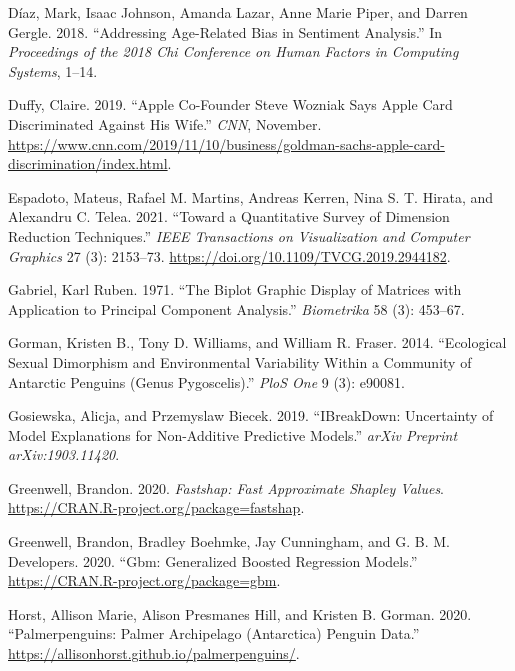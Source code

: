 \documentclass[11pt,twoside]{article}
\newlength{\cslhangindent}
\newlength{\cslentryspacingunit} %
\newenvironment{CSLReferences}[2] %
 {%
  \setlength{\parindent}{0pt}
  \ifodd #1
  \let\oldpar\par
  \def\par{\hangindent=\cslhangindent\oldpar}
  \fi
  \setlength{\parskip}{#2\cslentryspacingunit}
 }%
 {}
\begin{document}
\begin{CSLReferences}{1}{0}
\leavevmode{}%
Díaz, Mark, Isaac Johnson, Amanda Lazar, Anne Marie Piper, and Darren Gergle. 2018. {``Addressing Age-Related Bias in Sentiment Analysis.''} In \emph{Proceedings of the 2018 Chi Conference on Human Factors in Computing Systems}, 1--14.

\leavevmode{}%
Duffy, Claire. 2019. {``Apple Co-Founder {Steve} {Wozniak} Says {Apple} {Card} Discriminated Against His Wife.''} \emph{CNN}, November. \url{https://www.cnn.com/2019/11/10/business/goldman-sachs-apple-card-discrimination/index.html}.

\leavevmode{}%
Espadoto, Mateus, Rafael M. Martins, Andreas Kerren, Nina S. T. Hirata, and Alexandru C. Telea. 2021. {``Toward a {Quantitative} {Survey} of {Dimension} {Reduction} {Techniques}.''} \emph{IEEE Transactions on Visualization and Computer Graphics} 27 (3): 2153--73. \url{https://doi.org/10.1109/TVCG.2019.2944182}.

\leavevmode{}%
Gabriel, Karl Ruben. 1971. {``The Biplot Graphic Display of Matrices with Application to Principal Component Analysis.''} \emph{Biometrika} 58 (3): 453--67.

\leavevmode{}%
Gorman, Kristen B., Tony D. Williams, and William R. Fraser. 2014. {``Ecological Sexual Dimorphism and Environmental Variability Within a Community of {Antarctic} Penguins (Genus {Pygoscelis}).''} \emph{PloS One} 9 (3): e90081.

\leavevmode{}%
Gosiewska, Alicja, and Przemyslaw Biecek. 2019. {``{IBreakDown}: {Uncertainty} of Model Explanations for Non-Additive Predictive Models.''} \emph{arXiv Preprint arXiv:1903.11420}.

\leavevmode{}%
Greenwell, Brandon. 2020. \emph{Fastshap: {Fast} {Approximate} {Shapley} {Values}}. \url{https://CRAN.R-project.org/package=fastshap}.

\leavevmode{}%
Greenwell, Brandon, Bradley Boehmke, Jay Cunningham, and G. B. M. Developers. 2020. {``Gbm: {Generalized} {Boosted} {Regression} {Models}.''} \url{https://CRAN.R-project.org/package=gbm}.

\leavevmode{}%
Horst, Allison Marie, Alison Presmanes Hill, and Kristen B. Gorman. 2020. {``Palmerpenguins: {Palmer} {Archipelago} ({Antarctica}) Penguin Data.''} \url{https://allisonhorst.github.io/palmerpenguins/}.


\end{CSLReferences}
\end{document}
